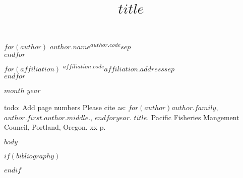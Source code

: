 \thispagestyle{empty} %
\begin{center}
\title{$title$}

\vspace{1.5cm}
{\Large\textbf{}}

\vspace{0.5cm}
$for(author)$
$author.name$\textsuperscript{$author.code$}$sep$\\
$endfor$
\end{center}
\vspace{0.5cm}
$for(affiliation)$
\textsuperscript{$affiliation.code$}$affiliation.address$$sep$\\
$endfor$
\vspace{0.5cm}

\begin{center}
{$month$} {$year$}
\end{center}

\vspace*{\fill}
todo: Add page numbers
\noindent Please cite as: $for(author)$$author.family$, $author.first$.$author.middle$., $endfor$$year$. $title$.
Pacific Fisheries Mangement Council, Portland, Oregon. xx p.

\newpage
\thispagestyle{empty} %
\tableofcontents
{}
\setcounter{page}{1}

\setlength{\parskip}{5mm plus1mm minus1mm}
\pagebreak
\setcounter{page}{1}
\renewcommand{\thefigure}{\alph{figure}}
\renewcommand{\thetable}{\alph{table}}

$body$

$if(bibliography)$

$endif$
